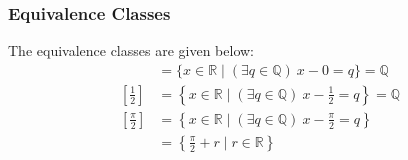 \documentclass{article}
\begin{document}
\subsubsection*{Equivalence Classes}
The equivalence classes are given below:
\begin{align*}
  [0]&=\{x\in\mathbb R\mid (\exists q\in\mathbb Q)\ x-0=q\}=\mathbb Q\\
  \left[\frac{1}{2}\right]&=\left\{x\in\mathbb R\mid (\exists q\in\mathbb Q)\ x-\frac{1}{2}=q\right\}=\mathbb Q\\
  \left[\frac{\pi}{2}\right]&=\left\{x\in\mathbb R\mid (\exists q\in\mathbb Q)\ x-\frac{\pi}{2}=q\right\}\\
  &=\left\{\frac{\pi}{2}+r\mid r\in\mathbb R\right\}\\
\end{align*}
\end{document}
